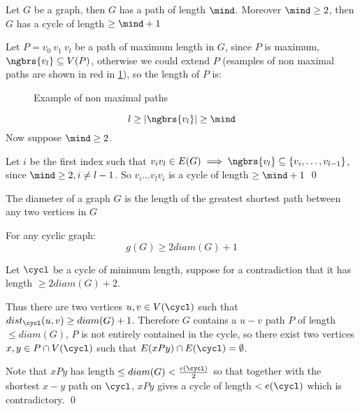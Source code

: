 \begin{proposition}
    Let $G$ be a graph, then $G$ has a path of length $\mind$. Moreover $\mind \geq 2$, then $G$ has a cycle of length $\geq \mind + 1$
\end{proposition}
\begin{prf}
    Let $P = v_0\:v_1\:v_l$ be a path of maximum length in $G$, since $P$ is maximum, $\ngbrs{v_l} \subseteq V(P)$, otherwise we could extend $P$ (esamples of non maximal paths are shown in red in \ref{fig:proposition1.6}), so the length of $P$ is:
    \begin{figure}[h]
        \centering
        
        \caption{Example of non maximal paths}
        \label{fig:proposition1.6}
    \end{figure}
    \begin{equation*}
        l \geq |\ngbrs{v_l}| \geq \mind
    \end{equation*}
    Now suppose $\mind \geq 2$.

    Let $i$ be the first index such that $v_iv_l \in E(G) \implies \ngbrs{v_l} \subseteq \{v_i, \dots, v_{l - 1}\}$, since $\mind \geq 2, i \neq l - 1$. So $v_i \dots v_lv_i$ is a cycle of length $\geq \mind + 1$ \qed
\end{prf}
\begin{definition}[Diameter]
    The diameter of a graph $G$ is the length of the greatest shortest path between any two vertices in $G$
\end{definition}
\begin{proposition}
    For any cyclic graph:
    \begin{equation*}
        g(G) \geq 2diam(G) + 1
    \end{equation*}
\end{proposition}
\begin{prf}
    Let $\cycl$ be a cycle of minimum length, suppose for a contradiction that it has length $\geq 2diam(G) + 2$.

    Thus there are two vertices $u, v \in V(\cycl)$ such that $dist_{\cycl}(u, v) \geq diam(G) + 1$. Therefore $G$ contains a $u - v$ path $P$ of length $\leq diam(G)$, $P$ is not entirely contained in the cycle, so there exist two vertices $x, y \in P \cap V(\cycl)$ such that $E(xPy) \cap E(\cycl) = \emptyset$.

    Note that $xPy$ has length $\leq diam(G) < \frac{e(\cycl)}{2}$ so that together with the shortest $x - y$ path on $\cycl$, $xPy$ gives a cycle of length $< e(\cycl)$ which is contradictory. \qed
\end{prf}